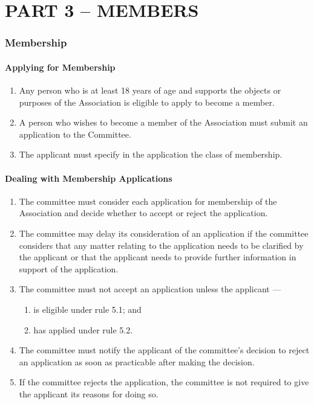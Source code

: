 \documentclass[../constitution.tex]{subfiles}
\begin{document}
\part{PART 3 -- MEMBERS} \label{part-3-members}

\section{Membership} \label{division-1-membership}

\subsection{Applying for Membership} \label{applying-for-membership}

\begin{enumerate}

\item Any person who is at least 18 years of age and supports the objects or purposes of the Association is eligible to apply to become a member.
\item A person who wishes to become a member of the Association must submit an application to the Committee.
\item The applicant must specify in the application the class of membership.
\end{enumerate}

\subsection{Dealing with Membership Applications}\label{dealing-with-membership-applications}

\begin{enumerate}

\item The committee must consider each application for membership of the Association and decide whether to accept or reject the application.
\item The committee may delay its consideration of an application if the committee considers that any matter relating to the application needs to be clarified by the applicant or that the applicant needs to provide further information in support of the application.
\item The committee must not accept an application unless the applicant ---

  \begin{enumerate}
  
  \item is eligible under rule 5.1; and
  \item has applied under rule 5.2.
  \end{enumerate}
\item The committee must notify the applicant of the committee's decision to reject an application as soon as practicable after making the decision.
\item If the committee rejects the application, the committee is not required to give the applicant its reasons for doing so.
\end{enumerate}
\end{document}
